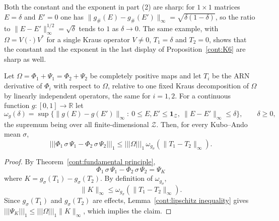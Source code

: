 \begin{remark}\label{cont:rem:sharp}
Both the constant and the exponent in part (2) are sharp: for $1\times1$ matrices $E=\delta$ and $E'=0$ one has $\|g_\#(E)-g_\#(E')\|_\infty=\sqrt{\delta(1-\delta)}$, so the ratio to $\|E-E'\|_\infty^{1/2}=\sqrt{\delta}$ tends to $1$ as $\delta\to 0$. The same example, with $\Omega=V(\cdot)V^*$ for a single Kraus operator $V\neq0$, $T_1=\delta$ and $T_2=0$, shows that the constant and the exponent in the last display of Proposition~\ref{cont:K6} are sharp as well.
\end{remark}
 
\begin{theorem}\label{cont:Modulus of continuity results}
    Let $\Omega=\Phi_1+\Psi_1=\Phi_2+\Psi_2$ be completely positive maps and let $T_i$ be the ARN derivative of $\Phi_i$ with respect to $\Omega$, relative to one fixed Kraus decomposition of $\Omega$ by linearly independent operators, the same for $i=1,2$. For a continuous function $g:[0,1]\to\mathbb{R}$ let \[\omega_g(\delta)=\sup\big\{\|g(E)-g(E')\|_\infty:\ 0\leq E,E'\leq\mathbf{1}_{\mathcal{Z}},\ \|E-E'\|_\infty\leq\delta\big\},\qquad\delta\geq0,\] the supremum being over all finite-dimensional $\mathcal{Z}$. Then, for every Kubo--Ando mean $\sigma$,
    \[
        |||\Phi_1\,\sigma\,\Psi_1-\Phi_2\,\sigma\,\Psi_2|||_1\leq |||\Omega|||_1\,\omega_{g_\sigma}(\|T_1-T_2\|_\infty). 
    \] 
\end{theorem}
    \begin{proof}
        By Theorem~\ref{cont:fundamental principle},
        \[
            \Phi_1\,\sigma\,\Psi_1-\Phi_2\,\sigma\,\Psi_2= \Psi_K
        \]
        where $K=g_\sigma(T_1)-g_\sigma(T_2)$. By definition of $\omega_{g_\sigma}$, 
    \[\|K\|_\infty\leq \omega_{g_\sigma}(\|T_1-T_2\|_\infty).\] Since $g_\sigma(T_1)$ and $g_\sigma(T_2)$ are effects, Lemma~\ref{cont:lipschitz inequality} gives 
   $|||\Psi_K|||_1\leq |||\Omega|||_1\|K\|_\infty$,
     which implies the claim.
     \end{proof}
 
 
 
